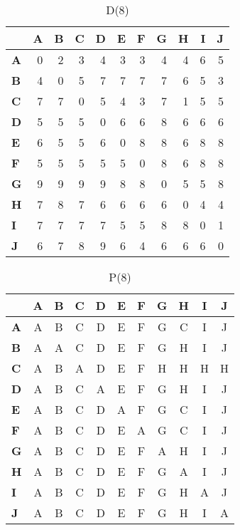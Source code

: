 \documentclass{article}
\begin{document}
\begin{table}[H]\centering
\caption{D(8)}
\begin{tabular}{l r r r r r r r r r r}
\toprule
 & \textbf{A} & \textbf{B} & \textbf{C} & \textbf{D} & \textbf{E} & \textbf{F} & \textbf{G} & \textbf{H} & \textbf{I} & \textbf{J}\\\midrule
\textbf{A} & 0 & 2 & 3 & 4 & 3 & 3 & 4 & 4 & 6 & 5 \\
\textbf{B} & 4 & 0 & 5 & 7 & 7 & 7 & 7 & 6 & 5 & 3 \\
\textbf{C} & 7 & 7 & 0 & 5 & 4 & 3 & \cellcolor{yellow!30}7 & 1 & \cellcolor{yellow!30}5 & \cellcolor{yellow!30}5 \\
\textbf{D} & 5 & 5 & 5 & 0 & 6 & 6 & 8 & 6 & 6 & 6 \\
\textbf{E} & 6 & 5 & 5 & 6 & 0 & 8 & 8 & 6 & 8 & 8 \\
\textbf{F} & 5 & 5 & 5 & 5 & 5 & 0 & 8 & 6 & 8 & 8 \\
\textbf{G} & 9 & 9 & 9 & 9 & 8 & 8 & 0 & 5 & 5 & 8 \\
\textbf{H} & 7 & 8 & 7 & 6 & 6 & 6 & 6 & 0 & 4 & 4 \\
\textbf{I} & 7 & 7 & 7 & 7 & 5 & 5 & 8 & 8 & 0 & 1 \\
\textbf{J} & 6 & 7 & 8 & 9 & 6 & 4 & 6 & 6 & 6 & 0 \\
\bottomrule
\end{tabular}
\end{table}

\begin{table}[H]\centering
\caption{P(8)}
\begin{tabular}{l c c c c c c c c c c}
\toprule
 & \textbf{A} & \textbf{B} & \textbf{C} & \textbf{D} & \textbf{E} & \textbf{F} & \textbf{G} & \textbf{H} & \textbf{I} & \textbf{J}\\\midrule
\textbf{A} & A & B & C & D & E & F & G & C & I & J \\
\textbf{B} & A & A & C & D & E & F & G & H & I & J \\
\textbf{C} & A & B & A & D & E & F & \cellcolor{yellow!30}H & H & \cellcolor{yellow!30}H & \cellcolor{yellow!30}H \\
\textbf{D} & A & B & C & A & E & F & G & H & I & J \\
\textbf{E} & A & B & C & D & A & F & G & C & I & J \\
\textbf{F} & A & B & C & D & E & A & G & C & I & J \\
\textbf{G} & A & B & C & D & E & F & A & H & I & J \\
\textbf{H} & A & B & C & D & E & F & G & A & I & J \\
\textbf{I} & A & B & C & D & E & F & G & H & A & J \\
\textbf{J} & A & B & C & D & E & F & G & H & I & A \\
\bottomrule
\end{tabular}
\end{table}
\end{document}
